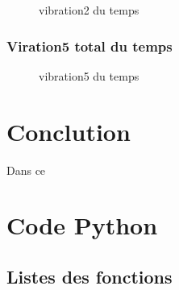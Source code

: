 \documentclass[a4paper,10pt]{report} %
\begin{document}
\begin{figure}[H]
\centering
\label{figure9}
\caption{vibration2 du temps}
\end{figure}

\subsection{Viration5 total du temps }

\begin{figure}[H]
\centering
\label{figure10}
\caption{vibration5 du temps}
\end{figure}
\chapter{Conclution}

Dans ce 


%
%
	

\appendix 
\chapter{Code Python}
\section{Listes des fonctions}
\end{document}
